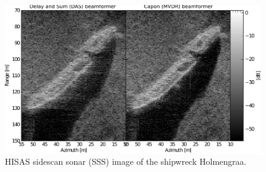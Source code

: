 \documentclass[10pt,a4paper]{article}
\newcommand\sumb[2]{\sum\limits_{#1}^{#2}\,}
\newcommand\1{\vec 1}
\renewcommand\gls[1]{#1}
\begin{document}


\newpage
\begin{figure}[!t]
\centering
\includegraphics[width=\linewidth]{gfx/img_holmengraa.pdf}
\caption{HISAS sidescan sonar (SSS) image of the shipwreck Holmengraa.}\label{holmengraa}
\end{figure}
\end{document}
